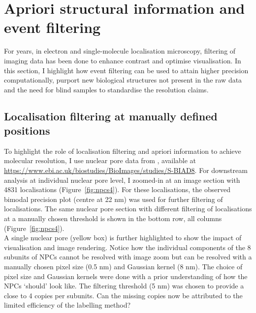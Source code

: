 \documentclass[9pt,twocolumn,twoside]{pnas-new}
\begin{document}
\section{Apriori structural information and event filtering}

For years, in electron and single-molecule localisation microscopy, filtering of imaging data has been done to enhance contrast and optimise visualisation. In this section, I highlight how event filtering can be used to attain higher precision computationally, purport new biological structures not present in the raw data and the need for blind samples to standardise the resolution claims.  

\subsection{Localisation filtering at manually defined positions}
To highlight the role of localisation filtering and apriori information to achieve molecular resolution, I use nuclear pore data from \citep{thevathasan2019nuclear}, available at \url{https://www.ebi.ac.uk/biostudies/BioImages/studies/S-BIAD8}.
For downstream analysis at individual nuclear pore level, I zoomed-in at an image section with 4831 localisations (Figure~\ref{fig:npcs4}). For these localisations, the observed bimodal precision plot (centre at 22 nm) was used for further filtering of localisations. The same nuclear pore section with different filtering of localisations at a manually chosen threshold is shown in the bottom row, all columns (Figure~\ref{fig:npcs4}). \\
A single nuclear pore (yellow box) is further highlighted to show the impact of visualisation and image rendering. Notice how the individual components of the 8 subunits of NPCs cannot be resolved with image zoom but can be resolved with a manually chosen pixel size (0.5 nm) and Gaussian kernel (8 nm). The choice of pixel size and Gaussian kernels were done with a prior understanding of how the NPCs `should' look like. The filtering threshold (5 nm) was chosen to provide a close to 4 copies per subunits. Can the missing copies now be attributed to the limited efficiency of the labelling method?
\end{document}
